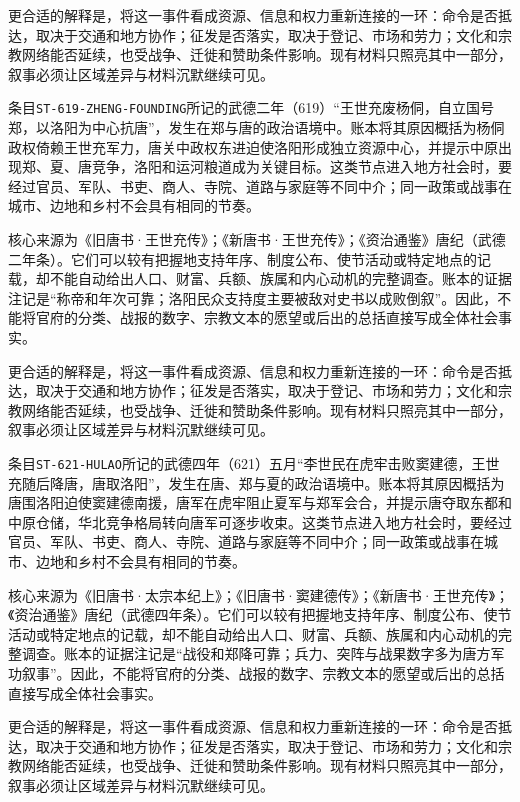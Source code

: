 更合适的解释是，将这一事件看成资源、信息和权力重新连接的一环：命令是否抵达，取决于交通和地方协作；征发是否落实，取决于登记、市场和劳力；文化和宗教网络能否延续，也受战争、迁徙和赞助条件影响。现有材料只照亮其中一部分，叙事必须让区域差异与材料沉默继续可见。


条目\texttt{ST-619-ZHENG-FOUNDING}所记的武德二年（619）“王世充废杨侗，自立国号郑，以洛阳为中心抗唐”，发生在郑与唐的政治语境中。账本将其原因概括为杨侗政权倚赖王世充军力，唐关中政权东进迫使洛阳形成独立资源中心，并提示中原出现郑、夏、唐竞争，洛阳和运河粮道成为关键目标。这类节点进入地方社会时，要经过官员、军队、书吏、商人、寺院、道路与家庭等不同中介；同一政策或战事在城市、边地和乡村不会具有相同的节奏。

核心来源为《旧唐书·王世充传》；《新唐书·王世充传》；《资治通鉴》唐纪（武德二年条）。它们可以较有把握地支持年序、制度公布、使节活动或特定地点的记载，却不能自动给出人口、财富、兵额、族属和内心动机的完整调查。账本的证据注记是“称帝和年次可靠；洛阳民众支持度主要被敌对史书以成败倒叙”。因此，不能将官府的分类、战报的数字、宗教文本的愿望或后出的总括直接写成全体社会事实。

更合适的解释是，将这一事件看成资源、信息和权力重新连接的一环：命令是否抵达，取决于交通和地方协作；征发是否落实，取决于登记、市场和劳力；文化和宗教网络能否延续，也受战争、迁徙和赞助条件影响。现有材料只照亮其中一部分，叙事必须让区域差异与材料沉默继续可见。


条目\texttt{ST-621-HULAO}所记的武德四年（621）五月“李世民在虎牢击败窦建德，王世充随后降唐，唐取洛阳”，发生在唐、郑与夏的政治语境中。账本将其原因概括为唐围洛阳迫使窦建德南援，唐军在虎牢阻止夏军与郑军会合，并提示唐夺取东都和中原仓储，华北竞争格局转向唐军可逐步收束。这类节点进入地方社会时，要经过官员、军队、书吏、商人、寺院、道路与家庭等不同中介；同一政策或战事在城市、边地和乡村不会具有相同的节奏。

核心来源为《旧唐书·太宗本纪上》；《旧唐书·窦建德传》；《新唐书·王世充传》；《资治通鉴》唐纪（武德四年条）。它们可以较有把握地支持年序、制度公布、使节活动或特定地点的记载，却不能自动给出人口、财富、兵额、族属和内心动机的完整调查。账本的证据注记是“战役和郑降可靠；兵力、突阵与战果数字多为唐方军功叙事”。因此，不能将官府的分类、战报的数字、宗教文本的愿望或后出的总括直接写成全体社会事实。

更合适的解释是，将这一事件看成资源、信息和权力重新连接的一环：命令是否抵达，取决于交通和地方协作；征发是否落实，取决于登记、市场和劳力；文化和宗教网络能否延续，也受战争、迁徙和赞助条件影响。现有材料只照亮其中一部分，叙事必须让区域差异与材料沉默继续可见。

